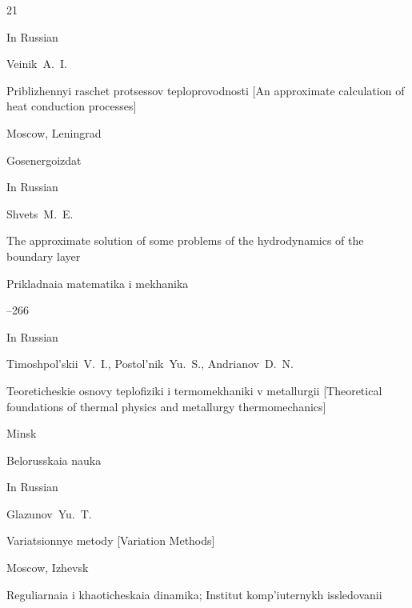 \begin{thebibliography}{21}








\lang In Russian

\by Veinik~A.~I.

\book Priblizhennyi raschet protsessov teploprovodnosti \rm [An approximate calculation of heat conduction processes]

\publaddr Moscow, Leningrad

\publ Gosenergoizdat








\lang In Russian

\by Shvets~M.~E. 

\paper The approximate solution of some problems of the hydrodynamics of the boundary layer

\jour Prikladnaia matematika i mekhanika




--266




\lang In Russian

\by Timoshpol'skii~V.~I., Postol'nik~Yu.~S., Andrianov~D.~N.

\book Teoreticheskie osnovy teplofiziki i termomekhaniki v metallurgii \rm [Theoretical foundations of thermal physics and metallurgy thermomechanics]

\publaddr Minsk

\publ Belorusskaia nauka








\lang In Russian

\by Glazunov~Yu.~T.

\book Variatsionnye metody \rm [Variation Methods]

\publaddr Moscow, Izhevsk

\publ Reguliarnaia i khaoticheskaia dinamika; Institut komp'iuternykh issledovanii


\end{thebibliography}
